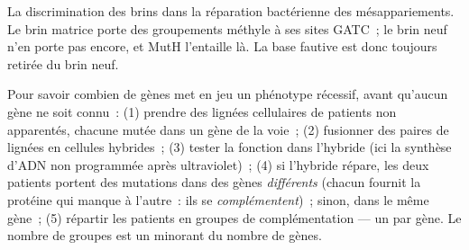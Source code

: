 \begin{omfigure}

{\small La discrimination des brins dans la réparation bactérienne des
mésappariements. Le brin matrice porte des groupements méthyle à ses
sites GATC~; le brin neuf n'en porte pas encore, et MutH l'entaille
là. La base fautive est donc toujours retirée du brin neuf.}
\end{omfigure}

\begin{method}\label{met:b3:dna-repair:complementation}
Pour savoir combien de gènes met en jeu un phénotype récessif, avant
qu'aucun gène ne soit connu~: (1) prendre des lignées cellulaires de
patients non apparentés, chacune mutée dans un gène de la voie~;
(2) fusionner des paires de lignées en cellules hybrides~; (3) tester
la fonction dans l'hybride (ici la synthèse d'ADN non programmée après
ultraviolet)~; (4) si l'hybride répare, les deux patients portent des
mutations dans des gènes \emph{différents} (chacun fournit la protéine
qui manque à l'autre~: ils se \emph{complémentent})~; sinon, dans le
même gène~; (5) répartir les patients en groupes de complémentation ---
un par gène. Le nombre de groupes est un minorant du nombre de gènes.
\end{method}

